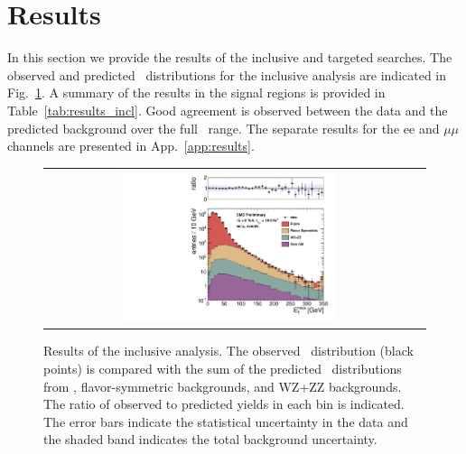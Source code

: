 \clearpage

\section{Results}

In this section we provide the results of the inclusive and targeted searches. 
The observed and predicted \MET\ distributions for the inclusive analysis are indicated in Fig.~\ref{fig:results_incl}. 
A summary of the results in the signal regions is provided in Table~\ref{tab:results_incl}. 
Good agreement is observed between the data and the predicted background over the full \MET\ range.
The separate results for the ee and $\mu\mu$ channels are presented in App.~\ref{app:results}.

\begin{figure}[!h]
\begin{center}
\begin{tabular}{cc}
\includegraphics[width=0.6\textwidth]{plots/pfmet_all_19p5fb.pdf}
\end{tabular}
\caption{Results of the inclusive analysis. The observed \MET\ distribution (black points) is compared with the sum of the predicted \MET\
distributions from \zjets, flavor-symmetric backgrounds, and WZ+ZZ backgrounds. The ratio of observed to predicted yields in each bin is
indicated. The error bars indicate the statistical uncertainty in the data and the shaded band indicates the total background uncertainty.
\label{fig:results_incl}
}
\end{center}
\end{figure}



